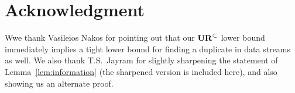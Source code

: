
\section*{Acknowledgment}
Wwe thank Vasileios Nakos for pointing out that our $\mathbf{UR}^\subset$ lower bound immediately implies a tight lower bound for finding a duplicate in data streams as well. We also thank T.S.\ Jayram for slightly sharpening the statement of Lemma~\ref{lem:information} (the sharpened version is included here), and also showing us an alternate proof.